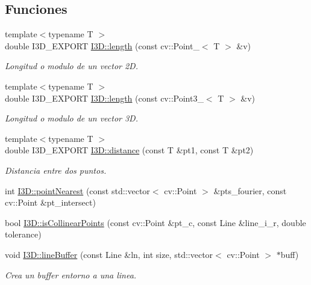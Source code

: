 \subsection*{Funciones}
\begin{DoxyCompactItemize}
\item 
{\footnotesize template$<$typename T $>$ }\\double I3\+D\+\_\+\+E\+X\+P\+O\+RT \hyperlink{group___geometric_entities_ga6cfd96fd34bd41f5b201d69d70daa705}{I3\+D\+::length} (const cv\+::\+Point\+\_\+$<$ T $>$ \&v)
\begin{DoxyCompactList}\small\item\em Longitud o modulo de un vector 2D. \end{DoxyCompactList}\item 
{\footnotesize template$<$typename T $>$ }\\double I3\+D\+\_\+\+E\+X\+P\+O\+RT \hyperlink{group___geometric_entities_gadc4e42bc957a28f97e0d45d09d5e1db7}{I3\+D\+::length} (const cv\+::\+Point3\+\_\+$<$ T $>$ \&v)
\begin{DoxyCompactList}\small\item\em Longitud o modulo de un vector 3D. \end{DoxyCompactList}\item 
{\footnotesize template$<$typename T $>$ }\\double I3\+D\+\_\+\+E\+X\+P\+O\+RT \hyperlink{group___geometric_entities_gaf3a6913bb5125e5d2e69a2e48c7336fd}{I3\+D\+::distance} (const T \&pt1, const T \&pt2)
\begin{DoxyCompactList}\small\item\em Distancia entre dos puntos. \end{DoxyCompactList}\item 
int \hyperlink{group___geometric_entities_ga50289ee8c51aeff4b2f4706acbabd932}{I3\+D\+::point\+Nearest} (const std\+::vector$<$ cv\+::\+Point $>$ \&pts\+\_\+fourier, const cv\+::\+Point \&pt\+\_\+intersect)
\item 
bool \hyperlink{group___geometric_entities_gaa7aa32d175a13ad9ac23bfe016754b1f}{I3\+D\+::is\+Collinear\+Points} (const cv\+::\+Point \&pt\+\_\+c, const Line \&line\+\_\+i\+\_\+r, double tolerance)
\item 
void \hyperlink{group___geometric_entities_gaa2e0864c0027dbf1cf826970a30d47a0}{I3\+D\+::line\+Buffer} (const Line \&ln, int size, std\+::vector$<$ cv\+::\+Point $>$ $\ast$buff)
\begin{DoxyCompactList}\small\item\em Crea un buffer entorno a una linea. \end{DoxyCompactList}\item 

\end{DoxyCompactItemize}

